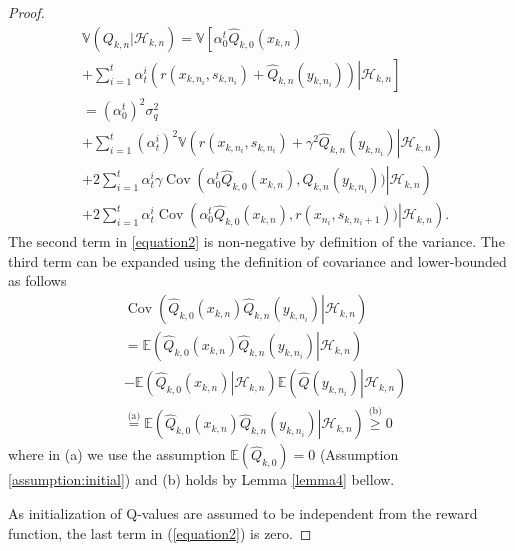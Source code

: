\documentclass[lettersize,journal]{IEEEtran}
\begin{document}
\begin{appendices}
\begin{proof}
\begin{align}
\label{equation2}
    &\mathbb{V}\left(Q_{k,n}\vert\mathcal{H}_{k,n}\right)= \mathbb{V}\left [\alpha_{0}^{t} \widehat{Q}_{k,0}(x_{k,n})\right.\nonumber \\ 
    &\left.\left.+\sum_{i=1}^{t} \alpha_{t}^{i}\left(r(x_{k,n_i},s_{k,n_i})+\widehat{Q}_{k,n}(y_{k,n_i})\right)\right| \mathcal{H}_{k,n}\right] \nonumber \\
    &=(\alpha_0^t)^2\sigma_q^2 \nonumber
    \\&+\sum_{i=1}^{t} (\alpha_{t}^{i})^2  \mathbb{V}\left.\left(r(x_{k,n_i},s_{k,n_i})+\gamma^2\widehat{Q}_{k,n}(y_{k,n_i})\right | \mathcal{H}_{k,n}\right) \nonumber\\
    &+2\sum_{i=1}^{t} \alpha_{t}^{i}\gamma \operatorname{Cov}\left. \left(\alpha_{0}^{t} \widehat{Q}_{k,0}(x_{k,n}),\widehat{Q}_{k,n}(y_{k,n_i}))\right | \mathcal{H}_{k,n}\right) \nonumber\\
    &+2\sum_{i=1}^{t} \alpha_{t}^{i}\operatorname{Cov}\left. \left(\alpha_{0}^{t} \widehat{Q}_{k,0}(x_{k,n}), r(x_{n_i},s_{k,n_i+1}))\right | \mathcal{H}_{k,n} \right).
\end{align}
The second term  in \eqref{equation2} is non-negative by definition of the variance. The third term can be expanded using the definition of covariance and lower-bounded as follows 
\begin{align}
\label{eq:inter1}
    &\operatorname{Cov}\left( \left. \widehat{Q}_{k,0}(x_{k,n}) \widehat{Q}_{k,n}(y_{k,n_i})\right|\mathcal{H}_{k,n}\right)\nonumber \\
    &= \mathbb{E}\left( \left.\widehat{Q}_{k,0}(x_{k,n})   \widehat{Q}_{k,n}(y_{k,n_i})\right|\mathcal{H}_{k,n}\right)\nonumber\\
    &- \mathbb{E}\left(\left. \widehat{Q}_{k,0}(x_{k,n})\right|\mathcal{H}_{k,n}\right)  \mathbb{E}\left( \left.\widehat{Q}(y_{k,n_i})\right|\mathcal{H}_{k,n}\right)\nonumber\\
    & \stackrel{\text{(a)}}{=}\mathbb{E}\left( \left.\widehat{Q}_{k,0}(x_{k,n})   \widehat{Q}_{k,n}(y_{k,n_i})\right|\mathcal{H}_{k,n}\right)\stackrel{\text{(b)}}{\geq} 0
\end{align}
where in (a) we use the assumption $\mathbb{E}(\widehat{Q}_{k,0})=0$ (Assumption \ref{assumption:initial}) and (b) holds by Lemma \ref{lemma4} bellow. \par 
 As initialization of Q-values are assumed to be independent from the reward function, the last term in (\ref{equation2}) is zero.


\end{proof}
\end{appendices}
\end{document}
